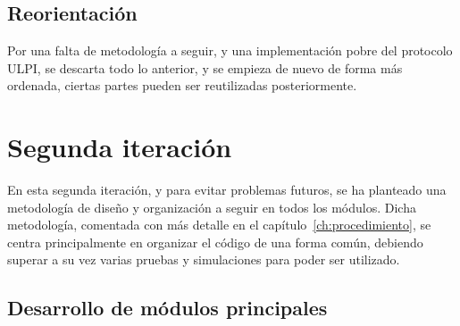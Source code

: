 \subsection{Reorientación}
Por una falta de metodología a seguir, y una implementación pobre del protocolo ULPI, se descarta todo lo anterior, y se empieza de nuevo de forma más ordenada, ciertas partes pueden ser reutilizadas posteriormente.

\section{Segunda iteración}
En esta segunda iteración, y para evitar problemas futuros, se ha planteado una metodología de diseño y organización a seguir en todos los módulos. Dicha metodología, comentada con más detalle en el capítulo~\ref{ch:procedimiento}, se centra principalmente en organizar el código de una forma común, debiendo superar a su vez varias pruebas y simulaciones para poder ser utilizado.

\subsection{Desarrollo de módulos principales}



